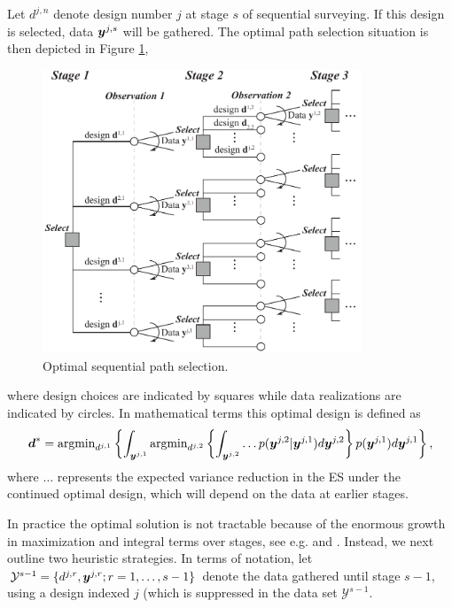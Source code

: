 \documentclass[aoas]{imsart}
\begin{document}
Let $d^{j,n}$ denote design number $j$ at stage $s$ of sequential surveying. If this design is selected, data ${\boldsymbol y}^{j,s}$ will be gathered. The optimal path selection situation is then depicted in Figure \ref{fig:PathSelOpt}, 
\begin{figure}[h!]
\centering
\includegraphics[width=0.85\textwidth]{Figures/sequent_select.pdf}
\caption{Optimal sequential path selection.}\label{fig:PathSelOpt}
\end{figure}
where design choices are indicated by squares while data realizations are indicated by circles. 
In mathematical terms this optimal design is defined as
\begin{equation}\label{opt_crit}
    \bd^* = \mbox{argmin}_{d^{j,1}} \left\{ \int_{\by^{j,1}} \mbox{argmin}_{d^{j,2}} \left\{ \int_{\by^{j,2}} \ldots p(\by^{j,2}|\by^{j,1}) d\by^{j,2} \right\} p(\by^{j,1}) d \by^{j,1} \right\},
\end{equation}
where $\ldots$ represents the expected variance reduction in the ES under the continued optimal design, which will depend on the data at earlier stages. 

In practice the optimal solution is not tractable because of the enormous growth in maximization and integral terms over stages, see e.g. \cite{sucar2015probabilistic} and \cite{powell2016perspectives}. Instead, we next outline two heuristic strategies. In terms of notation, let $\mathcal{Y}^{s-1} =\{d^{j,r}, {\boldsymbol y}^{j,r} ; r=1,\ldots,s-1 \}$ denote the data gathered until stage $s-1$, using a design indexed $j$ (which is suppressed in the data set $\mathcal{Y}^{s-1}$.
\end{document}
